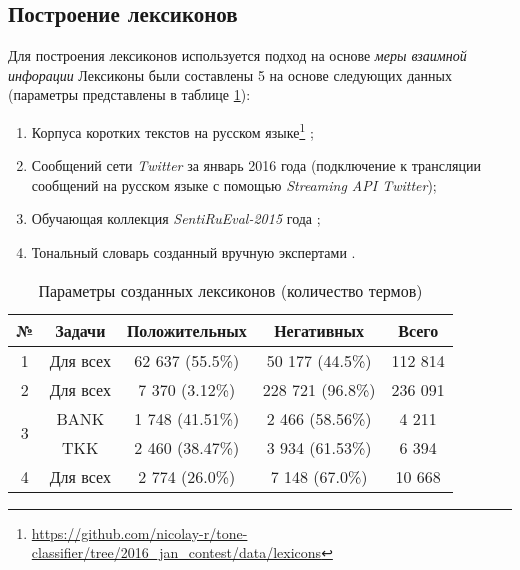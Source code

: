\subsection{Построение лексиконов}
Для построения лексиконов используется подход на основе {\it меры взаимной
инфорации}\cite{lexiconSO}
Лексиконы были составлены 5 на основе следующих данных (параметры представлены
в таблице \ref{table:createdLexicons}):

\begin{enumerate}
    \item Корпуса коротких текстов на русском языке\footnote{
            \url{https://github.com/nicolay-r/tone-classifier/tree/2016_jan_contest/data/lexicons}
    }
    \cite{rubtsovaCollection};
    \item Сообщений сети {\it Twitter }  за январь 2016 года (подключение к трансляции
        сообщений на русском языке с помощью {\it Streaming API Twitter});
    \item Обучающая коллекция {\it SentiRuEval-2015} года \cite{dialog2015};
    \item Тональный словарь созданный вручную экспертами \cite{expertLexicon}.
\end{enumerate}

\begin{table}[ht!]
\centering
\caption{Параметры созданных лексиконов (количество термов)}
\label{table:createdLexicons}
\begin{tabular}{|c|c|c|c|c|}
\hline
№                  & \multicolumn{1}{c|}{Задачи} & \multicolumn{1}{c|}{Положительных} & \multicolumn{1}{c|}{Негативных} & \multicolumn{1}{c|}{Всего} \\ \hline
1                  & Для всех                    & 62 637 (55.5\%)                              & 50 177 (44.5\%)                         & 112 814                            \\ \hline
2                  & Для всех                    & 7 370 (3.12\%)                               & 228 721 (96.8\%)                        & 236 091                            \\ \hline
\multirow{2}{*}{3} & BANK                        & 1 748 (41.51\%)                              & 2 466 (58.56\%)                         & 4 211                              \\ \cline{2-5}
                   & TKK                         & 2 460 (38.47\%)                              & 3 934 (61.53\%)                         & 6 394                              \\ \hline
4                  & Для всех                    & 2 774 (26.0\%)                               & 7 148 (67.0\%)                          & 10 668                             \\ \hline
\end{tabular}
\end{table}

